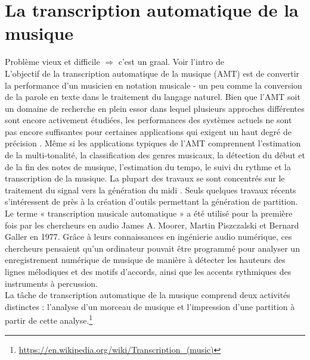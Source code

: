\section{La transcription automatique de la musique}
Problème vieux et difficile $\Rightarrow$ c’est un graal.
Voir l’intro de \cite{article1}\\
L'objectif de la transcription automatique de la musique (AMT) \cite{article1} est de convertir la performance d'un musicien en notation musicale - un peu comme la conversion de la parole en texte dans le traitement du langage naturel. Bien que l’AMT soit un domaine de recherche en plein essor dans lequel plusieurs approches différentes sont encore activement étudiées, les performances des systèmes actuels ne sont pas encore suffisantes pour certaines applications qui exigent un haut degré de précision \cite{article1}. Même si les applications typiques de l'AMT comprennent l'estimation de la multi-tonalité, la classification des genres musicaux, la détection du début et de la fin des notes de musique, l'estimation du tempo, le suivi du rythme et la transcription de la musique. La plupart des travaux se sont concentrés sur le traitement du signal vers la génération du midi \cite{article2}. Seuls quelques travaux récents \cite{foscarin:hal-01988990} s’intéressent de près à la création d’outils permettant la génération de partition.
Le terme « transcription musicale automatique » a été utilisé pour la première fois par les chercheurs en audio James A. Moorer, Martin Piszczalski et Bernard Galler en 1977. Grâce à leurs connaissances en ingénierie audio numérique, ces chercheurs pensaient qu'un ordinateur pouvait être programmé pour analyser un enregistrement numérique de musique de manière à détecter les hauteurs des lignes mélodiques et des motifs d'accords, ainsi que les accents rythmiques des instruments à percussion.\\La tâche de transcription automatique de la musique comprend deux activités distinctes : l'analyse d'un morceau de musique et l'impression d'une partition à partir de cette analyse.\footnote{\url{https://en.wikipedia.org/wiki/Transcription_(music)}}
